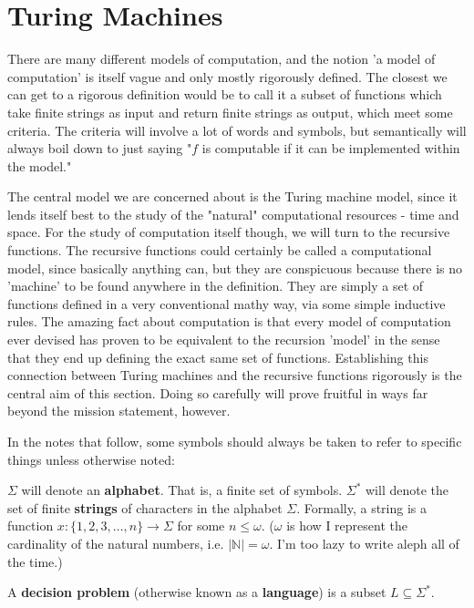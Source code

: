 \section{Turing Machines}
There are many different models of computation, and the notion 'a model of computation' is itself vague and only mostly rigorously defined. The closest we can get to a rigorous definition would be to call it a subset of functions which take finite strings as input and return finite strings as output, which meet some criteria. The criteria will involve a lot of words and symbols, but semantically will always boil down to just saying "$f$ is computable if it can be implemented within the model." 

The central model we are concerned about is the Turing machine model, since it lends itself best to the study of the "natural" computational resources - time and space. For the study of computation itself though, we will turn to the recursive functions. The recursive functions could certainly be called a computational model, since basically anything can, but they are conspicuous because there is no 'machine' to be found anywhere in the definition. They are simply a set of functions defined in a very conventional mathy way, via some simple inductive rules. The amazing fact about computation is that every model of computation ever devised has proven to be equivalent to the recursion 'model' in the sense that they end up defining the exact same set of functions. Establishing this connection between Turing machines and the recursive functions rigorously is the central aim of this section. Doing so carefully will prove fruitful in ways far beyond the mission statement, however.

In the notes that follow, some symbols should always be taken to refer to specific things unless otherwise noted:

$\Sigma$ will denote an \textbf{alphabet}. That is, a finite set of symbols. 
$\Sigma^*$ will denote the set of finite \textbf{strings} of characters in the alphabet $\Sigma$. Formally, a string is a function $x: \{1,2,3,\ldots,n\}\to \Sigma$ for some $n \leq \omega$. ($\omega$ is how I represent the cardinality of the natural numbers, i.e. $|\mathbb{N}| = \omega$. I'm too lazy to write aleph all of the time.)

\begin{definition}
A \textbf{decision problem} (otherwise known as a \textbf{language}) is a subset $L \subseteq \Sigma^*$.
\end{definition}

